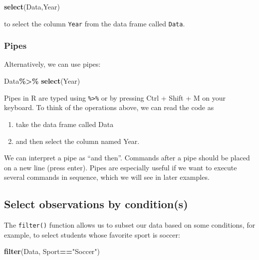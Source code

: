 \documentclass[
]{book}
\newenvironment{Shaded}{\begin{snugshade}}{\end{snugshade}}
\newcommand{\FunctionTok}[1]{\textcolor[rgb]{0.13,0.29,0.53}{\textbf{#1}}}
\newcommand{\NormalTok}[1]{#1}
\newcommand{\SpecialCharTok}[1]{\textcolor[rgb]{0.81,0.36,0.00}{\textbf{#1}}}
\newcommand{\StringTok}[1]{\textcolor[rgb]{0.31,0.60,0.02}{#1}}
\providecommand{\tightlist}{%
  \setlength{\itemsep}{0pt}\setlength{\parskip}{0pt}}
\begin{document}
\begin{Shaded}
\begin{Highlighting}[]
\FunctionTok{select}\NormalTok{(Data,Year)}
\end{Highlighting}
\end{Shaded}

to select the column \texttt{Year} from the data frame called \texttt{Data}.

\hypertarget{pipes}{%
\subsubsection{Pipes}\label{pipes}}

Alternatively, we can use pipes:

\begin{Shaded}
\begin{Highlighting}[]
\NormalTok{Data}\SpecialCharTok{\%\textgreater{}\%}
  \FunctionTok{select}\NormalTok{(Year)}
\end{Highlighting}
\end{Shaded}

Pipes in R are typed using \texttt{\%\textgreater{}\%} or by pressing Ctrl + Shift + M on your keyboard. To think of the operations above, we can read the code as

\begin{enumerate}
\def\labelenumi{\arabic{enumi}.}
\tightlist
\item
  take the data frame called Data
\item
  and then select the column named Year.
\end{enumerate}

We can interpret a pipe as ``and then''. Commands after a pipe should be placed on a new line (press enter). Pipes are especially useful if we want to execute several commands in sequence, which we will see in later examples.

\hypertarget{select-observations-by-conditions-1}{%
\subsection{Select observations by condition(s)}\label{select-observations-by-conditions-1}}

The \texttt{filter()} function allows us to subset our data based on some conditions, for example, to select students whose favorite sport is soccer:

\begin{Shaded}
\begin{Highlighting}[]
\FunctionTok{filter}\NormalTok{(Data, Sport}\SpecialCharTok{==}\StringTok{"Soccer"}\NormalTok{)}
\end{Highlighting}
\end{Shaded}
\end{document}
